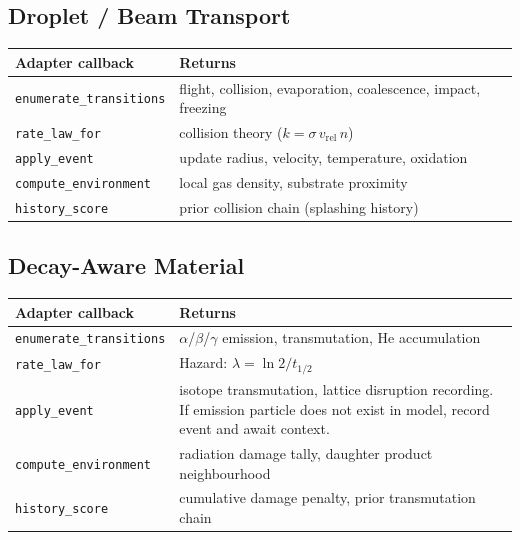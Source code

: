 \documentclass[11pt]{article}
\begin{document}
\subsection{Droplet / Beam Transport}

\begin{center}
\begin{tabular}{ll}
\toprule
Adapter callback & Returns \\
\midrule
\texttt{enumerate\_transitions} &
  flight, collision, evaporation, coalescence, impact, freezing \\
\texttt{rate\_law\_for} &
  collision theory ($k = \sigma\, v_\text{rel}\, n$) \\
\texttt{apply\_event} &
  update radius, velocity, temperature, oxidation \\
\texttt{compute\_environment} &
  local gas density, substrate proximity \\
\texttt{history\_score} &
  prior collision chain (splashing history) \\
\bottomrule
\end{tabular}
\end{center}

\subsection{Decay-Aware Material}

\begin{center}
\begin{tabular}{ll}
\toprule
Adapter callback & Returns \\
\midrule
\texttt{enumerate\_transitions} &
  $\alpha$/$\beta$/$\gamma$ emission, transmutation, He accumulation \\
\texttt{rate\_law\_for} &
  Hazard: $\lambda = \ln 2 / t_{1/2}$ \\
\texttt{apply\_event} &
  isotope transmutation, lattice disruption recording.
  If emission particle does not exist in model,
  record event and await context. \\
\texttt{compute\_environment} &
  radiation damage tally, daughter product neighbourhood \\
\texttt{history\_score} &
  cumulative damage penalty, prior transmutation chain \\
\bottomrule
\end{tabular}
\end{center}

\end{document}
